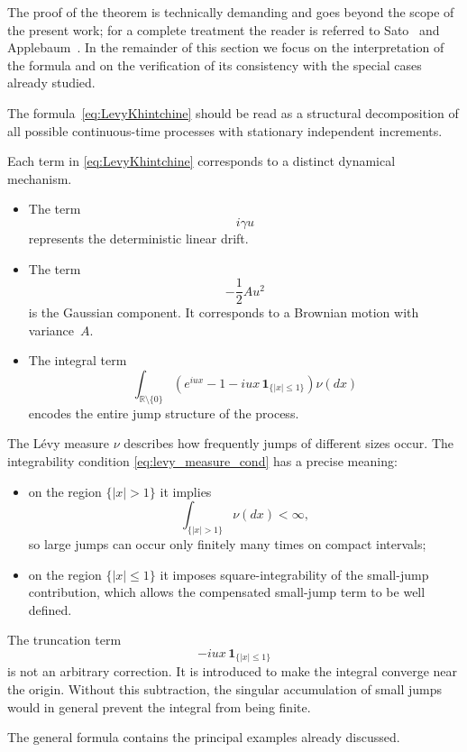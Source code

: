 The proof of the theorem is technically demanding and goes beyond the scope of the present work; for a complete treatment the reader is referred to Sato~\cite[Theorem~8.1]{Sato1999} and Applebaum~\cite[Theorem~1.3.3]{Applebaum2009}. In the remainder of this section we focus on the interpretation of the formula and on the verification of its consistency with the special cases already studied.

The formula~\eqref{eq:LevyKhintchine} should be read as a structural decomposition of all possible continuous-time processes with stationary independent increments.

Each term in \eqref{eq:LevyKhintchine} corresponds to a distinct dynamical mechanism.

\begin{itemize}[label = --]
    \item The term
    \[
    i\gamma u
    \]
    represents the deterministic linear drift.
    \item The term
    \[
    -\frac{1}{2}Au^2
    \]
    is the Gaussian component. It corresponds to a Brownian motion with variance~$A$.
    \item The integral term
    \[
    \int_{\mathbb{R}\setminus\{0\}}
    \left(
    e^{iux}-1-iux\,\mathbf{1}_{\{|x|\leq 1\}}
    \right)\nu(dx)
    \]
    encodes the entire jump structure of the process.
\end{itemize}

The L\'evy measure $\nu$ describes how frequently jumps of different sizes occur. The integrability condition \eqref{eq:levy_measure_cond} has a precise meaning:
\begin{itemize}[label = --]
    \item on the region $\{|x|>1\}$ it implies
    \[
    \int_{\{|x|>1\}} \nu(dx)<\infty,
    \]
    so large jumps can occur only finitely many times on compact intervals;
    \item on the region $\{|x|\leq 1\}$ it imposes square-integrability of the small-jump contribution, which allows the compensated small-jump term to be well defined.
\end{itemize}

The truncation term
\[
-iux\,\mathbf{1}_{\{|x|\leq 1\}}
\]
is not an arbitrary correction. It is introduced to make the integral converge near the origin. Without this subtraction, the singular accumulation of small jumps would in general prevent the integral from being finite.


The general formula contains the principal examples already discussed.

